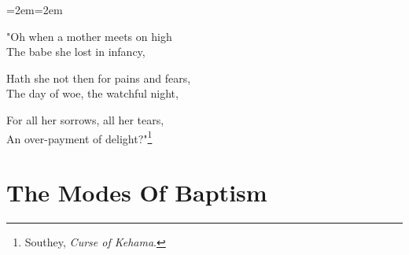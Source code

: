 \documentclass[english,]{book}
\newenvironment{poetry}[0]{\par\leftskip=2em\rightskip=2em}{\par\medskip}
\begin{document}
\begin{poetry}

"Oh when a mother meets on high\\
The babe she lost in infancy,

Hath she not then for pains and fears,\\
The day of woe, the watchful night,

For all her sorrows, all her tears,\\
An over-payment of delight?"\footnote{Southey, \emph{Curse of Kehama}.}

\end{poetry}

\hypertarget{the-modes-of-baptism}{%
\section{The Modes Of Baptism}\label{the-modes-of-baptism}}
\end{document}
